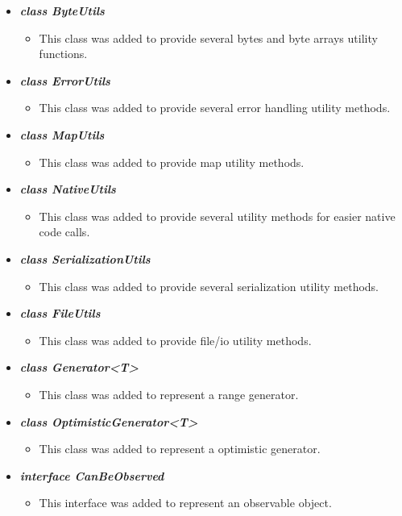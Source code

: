 \documentclass[a4paper,10pt]{scrartcl}
\begin{document}
\begin{itemize}
  
   \item \textbf{\textit{class ByteUtils}}
	\begin{itemize}
	 \item This class was added to provide several bytes and byte arrays utility functions.
	\end{itemize}
	
	 \item \textbf{\textit{class ErrorUtils}}
	\begin{itemize}
	 \item This class was added to provide several error handling utility methods.
	\end{itemize}
	
	 \item \textbf{\textit{class MapUtils}}
	\begin{itemize}
	 \item This class was added to provide map utility methods.
	\end{itemize}
	
   \item \textit{\textbf{class NativeUtils}}
	\begin{itemize}
	 \item This class was added to provide several utility methods for easier native code calls.
	\end{itemize}
	
	\item \textit{\textbf{class SerializationUtils}}
	\begin{itemize}
	 \item This class was added to provide several serialization utility methods.
	\end{itemize}
	
	\item \textit{\textbf{class FileUtils}}
	\begin{itemize}
	 \item This class was added to provide file/io utility methods.
	\end{itemize}
	
	\item \textit{\textbf{class Generator<T>}}
	\begin{itemize}
	 \item This class was added to represent a range generator.
	\end{itemize}
	
	\item \textit{\textbf{class OptimisticGenerator<T>}}
	\begin{itemize}
	 \item This class was added to represent a optimistic generator.
	\end{itemize}
	
	\item \textit{\textbf{interface CanBeObserved}}
	\begin{itemize}
	 \item This interface was added to represent an observable object.
	\end{itemize}
	
	\end{itemize}
	
\end{document}

